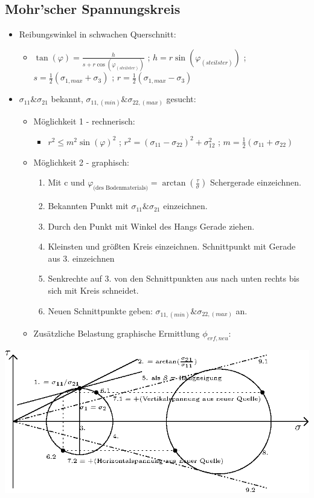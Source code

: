 \documentclass[fleqn,twoside]{article}
\begin{document}
\subsection{Mohr'scher Spannungskreis}
\begin{itemize}
    \item Reibungswinkel in schwachen Querschnitt:
    \begin{itemize}
        \item $\tan(\varphi) = \frac{h}{s+r\cos(\varphi_{(steilster)})}$ ; $h=r\sin(\varphi_{(steilster)})$ ; $s=\frac{1}{2}(\sigma_{1,max}+\sigma_3)$ ; $r=\frac{1}{2}(\sigma_{1,max}-\sigma_3) $
    \end{itemize}

	\item$\sigma_{11} \& \sigma_{21}$ bekannt, $\sigma_{11,(min)} \& \sigma_{22,(max)}$ gesucht:
	\begin{itemize}
	\item Möglichkeit 1 - rechnerisch:
	\begin{itemize}
	    \item $r^2 \leq m^2 \sin(\varphi)^2$ ; $r^2 = (\sigma_{11} - \sigma_{22})^2 + \sigma_{12}^2$ ; $m = \frac{1}{2} (\sigma_{11}+\sigma_{22})$
	\end{itemize}
	\item Möglichkeit 2 - graphisch:
		
		\begin{enumerate}
		\item Mit c und $\varphi_{\text{(des Bodenmaterials)}}=\arctan\left(\frac{\tau}{\sigma}\right)$ Schergerade einzeichnen.
		\item Bekannten Punkt mit $\sigma_{11} \& \sigma_{21}$ einzeichnen.
		\item Durch den Punkt mit Winkel des Hangs Gerade ziehen.
		\item Kleinsten und größten Kreis einzeichnen. Schnittpunkt mit Gerade aus 3. einzeichnen
		\item Senkrechte auf 3. von den Schnittpunkten aus nach unten rechts bis sich mit Kreis schneidet.
		\item Neuen Schnittpunkte geben: $\sigma_{11,(min)} \& \sigma_{22,(max)}$ an.
		\end{enumerate}
	\item Zusätzliche Belastung graphische Ermittlung $\phi_{erf,neu}$:
\end{itemize}
\end{itemize}
    \includegraphics[width=1\textwidth]{Grafiken/Spannung_aus_Fundament_(Mohrscher).eps}
\end{document}
